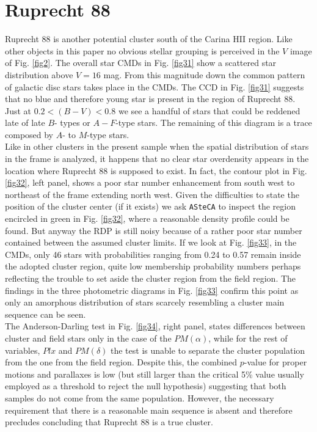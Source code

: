 \documentclass{aa}
\begin{document}
\section{Ruprecht 88}

Ruprecht 88 is another potential cluster south of the Carina HII region. Like
other objects in this paper no obvious stellar grouping is perceived in the $V$
image of Fig. \ref{fig2}. The overall star CMDs in Fig. \ref{fig31} show a
scattered star distribution above $V = 16$ mag. From this magnitude down the
common pattern of galactic disc stars takes place in the CMDs. The CCD in Fig.
\ref{fig31} suggests that no blue and therefore young star is present in the
region of Ruprecht 88. Just at $0.2 < (B-V) < 0.8$ we see a handful of stars that
could be reddened late of late $B$- types or $A-F$-type stars. The remaining of
this diagram is a trace composed by $A$- to $M$-type stars.\\

Like in other clusters in the present sample when the spatial distribution of
stars in the frame is analyzed, it happens that no clear star overdensity
appears in the location where Ruprecht 88 is supposed to exist. In fact, the
contour plot in Fig. \ref{fig32}, left panel, shows a poor star number
enhancement from south west to northeast of the frame extending north west.
Given the difficulties to state the position of the cluster center (if it
exists) we ask \texttt{ASteCA} to inspect the region encircled in green in Fig.
\ref{fig32}, where a reasonable density profile could be found. But anyway the
RDP is still noisy because of a rather poor star number contained between the
assumed cluster limits. If we look at Fig. \ref{fig33}, in the CMDs, only 46
stars with probabilities ranging from 0.24 to 0.57 remain inside the adopted
cluster region, quite low membership probability numbers perhaps reflecting the
trouble to set aside the cluster region from the field region. The findings in
the three photometric diagrams in Fig. \ref{fig33} confirm this point as only an
amorphous distribution of stars scarcely resembling a cluster main sequence can
be seen.\\

The Anderson-Darling test in Fig. \ref{fig34}, right panel, states differences
between cluster and field stars only in the case of the $PM(\alpha)$, while
for the rest of variables, $Plx$ and $PM(\delta)$ the test is unable to separate
the cluster population from the one from the field region. Despite this, the
combined $p$-value for proper motions and parallaxes is low (but still larger
than the critical 5\% value usually employed as a threshold to reject the
null hypothesis)
suggesting that both samples do not come from the same population. However, the
necessary requirement that there is a reasonable main sequence is absent and
therefore precludes concluding that Ruprecht 88 is a true cluster.
\end{document}
